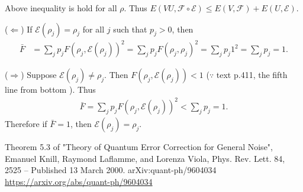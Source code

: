Above inequality is hold for all $\rho$. Thus $E(VU, \mathcal{F} \circ \mathcal{E}) \leq E(V, \mathcal{F})+ E(U, \mathcal{E})$.

($\Leftarrow$)
If $\mathcal{E}(\rho_j) = \rho_j$ for all $j$ such that $p_j > 0$, then
\begin{align*}
    \bar{F} &= \sum_j p_j F(\rho_j, \mathcal{E}(\rho_j))^2 = \sum_j p_j F(\rho_j, \rho_j)^2 = \sum_j p_j 1^2 = \sum_j p_j = 1.
\end{align*}

($\Rightarrow$) Suppose $\mathcal{E}(\rho_j) \neq \rho_j$.  Then $F(\rho_j, \mathcal{E}(\rho_j)) < 1$ ($\because$  text p.411, the fifth line from bottom ).
Thus
\begin{align*}
    \bar{F} = \sum_j p_j F(\rho_j, \mathcal{E}(\rho_j))^2 < \sum_j p_j = 1.
\end{align*}
Therefore if $\bar{F} = 1$, then $\mathcal{E}(\rho_j) = \rho_j$.



Theorem 5.3 of
"Theory of Quantum Error Correction for General Noise",
Emanuel Knill, Raymond Laflamme, and Lorenza Viola,
Phys. Rev. Lett. 84, 2525 – Published 13 March 2000.
arXiv:quant-ph/9604034
\url{https://arxiv.org/abs/quant-ph/9604034}




